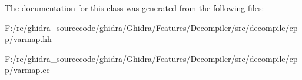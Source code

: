 The documentation for this class was generated from the following files\+:\begin{DoxyCompactItemize}
\item 
F\+:/re/ghidra\+\_\+sourcecode/ghidra/\+Ghidra/\+Features/\+Decompiler/src/decompile/cpp/\mbox{\hyperlink{varmap_8hh}{varmap.\+hh}}\item 
F\+:/re/ghidra\+\_\+sourcecode/ghidra/\+Ghidra/\+Features/\+Decompiler/src/decompile/cpp/\mbox{\hyperlink{varmap_8cc}{varmap.\+cc}}\end{DoxyCompactItemize}
